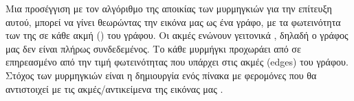 Μια προσέγγιση με τον αλγόριθμο της αποικίας των μυρμηγκιών για την επίτευξη αυτού, μπορεί να γίνει θεωρώντας την εικόνα μας ως ένα γράφο, με τα φωτεινότητα των  της σε κάθε ακμή () του γράφου. Οι ακμές ενώνουν γειτονικά , δηλαδή ο γράφος μας δεν είναι πλήρως συνδεδεμένος. Το κάθε μυρμήγκι προχωράει από  σε  επηρεασμένο από την τιμή φωτεινότητας που υπάρχει στις ακμές (edges) του γράφου. Στόχος των μυρμηγκιών είναι η δημιουργία ενός πίνακα με φερομόνες που θα αντιστοιχεί με τις ακμές/αντικείμενα της εικόνας μας \cite{baterina2010image, nezamabadi2006edge, tian2008ant}. 


